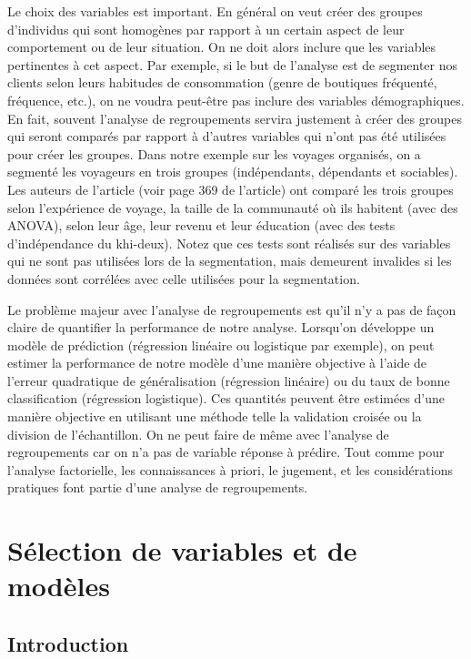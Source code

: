 \documentclass[
  11pt,
  letterpaper,
]{book}
\theoremstyle{definition}
\theoremstyle{definition}
\theoremstyle{definition}
\theoremstyle{definition}
\theoremstyle{remark}
\begin{document}
Le choix des variables est important. En général on veut créer des groupes d'individus qui sont homogènes par rapport à un certain aspect de leur comportement ou de leur situation. On ne doit alors inclure que les variables pertinentes à cet aspect. Par exemple, si le but de l'analyse est de segmenter nos clients selon leurs habitudes de consommation (genre de boutiques fréquenté, fréquence, etc.), on ne voudra peut-être pas inclure des variables démographiques. En fait, souvent l'analyse de regroupements servira justement à créer des groupes qui seront comparés par rapport à d'autres variables qui n'ont pas été utilisées pour créer les groupes. Dans notre exemple sur les voyages organisés, on a segmenté les voyageurs en trois groupes (indépendants, dépendants et sociables). Les auteurs de l'article (voir page 369 de l'article) ont comparé les trois groupes selon l'expérience de voyage, la taille de la communauté où ils habitent (avec des ANOVA), selon leur âge, leur revenu et leur éducation (avec des tests d'indépendance du khi-deux). Notez que ces tests sont réalisés sur des variables qui ne sont pas utilisées lors de la segmentation, mais demeurent invalides si les données sont corrélées avec celle utilisées pour la segmentation.

Le problème majeur avec l'analyse de regroupements est qu'il n'y a pas de façon claire de quantifier la performance de notre analyse. Lorsqu'on développe un modèle de prédiction (régression linéaire ou logistique par exemple), on peut estimer la performance de notre modèle d'une manière objective à l'aide de l'erreur quadratique de généralisation (régression linéaire) ou du taux de bonne classification (régression logistique). Ces quantités peuvent être estimées d'une manière objective en utilisant une méthode telle la validation croisée ou la division de l'échantillon. On ne peut faire de même avec l'analyse de regroupements car on n'a pas de variable réponse à prédire. Tout comme pour l'analyse factorielle, les connaissances à priori, le jugement, et les considérations pratiques font partie d'une analyse de regroupements.

\hypertarget{selection-modele}{%
\chapter{Sélection de variables et de modèles}\label{selection-modele}}

\hypertarget{introduction-3}{%
\section{Introduction}\label{introduction-3}}
\end{document}
